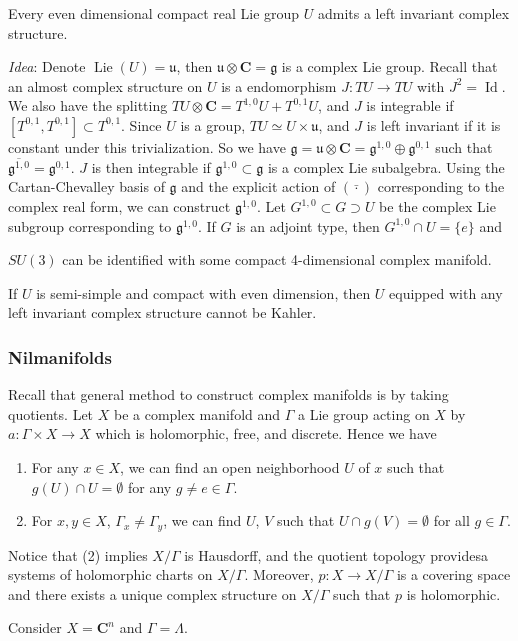 \documentclass[
11pt, %
letterpaper， %
oneside, %
headinclude,footinclude, %
BCOR5mm, %
]{scrartcl}
\newcommand{\C}{{\mathbf{C}}}
\newcommand{\id}{\operatorname{Id}}
\newcommand{\lie}{\operatorname{Lie}}
\newcommand{\its}{\textit}
\begin{document}
\begin{rem}
	Every even dimensional compact real Lie group $U$ admits a left invariant complex structure.
	
	\its{Idea}: Denote $\lie(U)=\mathfrak{u}$, then $\mathfrak{u}\otimes\C =\mathfrak{g}$ is a complex Lie group. Recall that an almost complex structure on $U$ is a endomorphism $ J: TU\to TU$ with $J^2=\id$. We also have the splitting $TU\otimes \C= T^{1,0}U+ T^{0,1}U$, and $J$ is integrable if $[{T^{0,1}}, T^{0,1}]\subset T^{0,1}$. Since $U$ is a group, $TU\simeq U\times \mathfrak{u}$, and $J$ is left invariant if it is constant under this trivialization. So we have $\mathfrak{g}=\mathfrak{u} \otimes \C= \mathfrak{g}^{1,0}\oplus \mathfrak{g}^{0,1}$ such that $\overline{\mathfrak{g}^{1,0}}=\mathfrak{g}^{0,1}$. $J$ is then integrable if $\mathfrak{g}^{1,0}\subset \mathfrak{g}$ is a complex Lie subalgebra. Using the Cartan-Chevalley basis of $\mathfrak{g}$ and the explicit action of $(\bar{\cdot})$ corresponding to the complex real form, we can construct $\mathfrak{g}^{1,0}$. Let $G^{1,0}\subset G \supset U$ be the complex Lie subgroup corresponding to $\mathfrak{g}^{1,0}$. If $G$ is an adjoint type, then $G^{1,0}\cap U=\{e\}$ and
\begin{center}
\end{center}
 \end{rem}

\begin{ex}
	$SU(3)$ can be identified with some compact 4-dimensional complex manifold.
\end{ex}
If $U$ is semi-simple and compact with even dimension, then $U$ equipped with any left invariant complex structure cannot be Kahler.

\subsubsection{Nilmanifolds}
Recall that general method to construct complex manifolds is by taking quotients. Let $X$ be a complex manifold and $\Gamma$ a Lie group acting on $X$ by $a:\Gamma \times X\to X$ which is holomorphic, free, and discrete. Hence we have 
\begin{enumerate}
	\item For any $x\in X$, we can find an open neighborhood $U$ of $x$ such that $g(U)\cap U=\emptyset$ for any $g\not= e \in \Gamma$.  
	\item For $x, y\in X$, $\Gamma_{x}\not=\Gamma_{y}$, we can find $U$, $V$ such that $U\cap g(V)=\emptyset$ for all $g\in \Gamma$. 
\end{enumerate}
Notice that (2) implies $X/\Gamma$ is Hausdorff, and the quotient topology providesa systems of holomorphic charts on $X/\Gamma$. Moreover, $p: X\to X/\Gamma$ is a covering space and there exists a unique complex structure on $X/\Gamma$ such that $p$ is holomorphic. 
\begin{ex}
	Consider $X=\C^n$ and $\Gamma= \Lambda$.
\end{ex}
\end{document}
